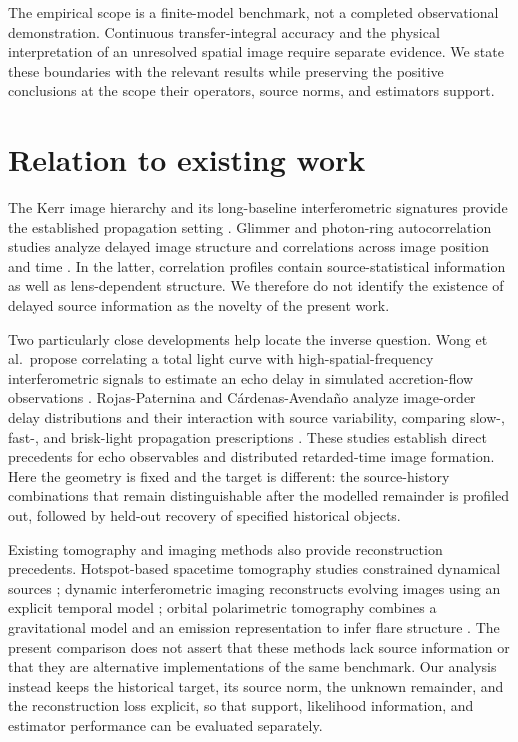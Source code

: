 The empirical scope is a finite-model benchmark, not a completed observational demonstration. Continuous transfer-integral accuracy and the physical interpretation of an unresolved spatial image require separate evidence. We state these boundaries with the relevant results while preserving the positive conclusions at the scope their operators, source norms, and estimators support.

\section{Relation to existing work}\label{sec:related}
The Kerr image hierarchy and its long-baseline interferometric signatures provide the established propagation setting \cite{gralla,johnson}. Glimmer and photon-ring autocorrelation studies analyze delayed image structure and correlations across image position and time \cite{wong,hadar}. In the latter, correlation profiles contain source-statistical information as well as lens-dependent structure. We therefore do not identify the existence of delayed source information as the novelty of the present work.

Two particularly close developments help locate the inverse question. Wong et al.\ propose correlating a total light curve with high-spatial-frequency interferometric signals to estimate an echo delay in simulated accretion-flow observations \cite{echoes2024}. Rojas-Paternina and C\'ardenas-Avenda\~no analyze image-order delay distributions and their interaction with source variability, comparing slow-, fast-, and brisk-light propagation prescriptions \cite{propagation2026}. These studies establish direct precedents for echo observables and distributed retarded-time image formation. Here the geometry is fixed and the target is different: the source-history combinations that remain distinguishable after the modelled remainder is profiled out, followed by held-out recovery of specified historical objects.

Existing tomography and imaging methods also provide reconstruction precedents. Hotspot-based spacetime tomography studies constrained dynamical sources \cite{tiede}; dynamic interferometric imaging reconstructs evolving images using an explicit temporal model \cite{bouman}; orbital polarimetric tomography combines a gravitational model and an emission representation to infer flare structure \cite{levis}. The present comparison does not assert that these methods lack source information or that they are alternative implementations of the same benchmark. Our analysis instead keeps the historical target, its source norm, the unknown remainder, and the reconstruction loss explicit, so that support, likelihood information, and estimator performance can be evaluated separately.


